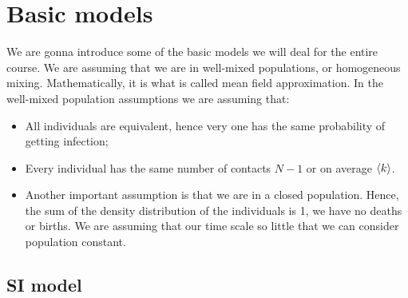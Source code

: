 \documentclass[../main/main.tex]{subfiles}
\begin{document}

\section{Basic models}

We are gonna introduce some of the basic models we will deal for the entire course.
We are assuming that we are in well-mixed populations, or homogeneous mixing. Mathematically, it is what is called mean field approximation.
In the well-mixed population assumptions we are assuming that:
\begin{itemize}
\item All individuals are equivalent, hence very one has the same probability of getting infection;
\item Every individual has the same number of contacts \( N-1 \) or on average \( \expval{k}  \).
\item Another important assumption is that we are in a closed population. Hence, the sum of the density distribution of the individuals is 1, we have no deaths or births. We are assuming that our time scale so little that we can consider population constant.
\end{itemize}

\subsection{SI model}
\end{document}

